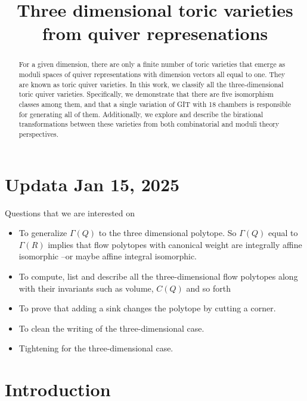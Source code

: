 \documentclass[11pt]{amsart}
\title{
Three dimensional toric varieties from quiver represenations
}
\date{}
\theoremstyle{plain}
\theoremstyle{definition}
\begin{document}
\begin{abstract}
For a given dimension, there are only a finite number of toric varieties that emerge as moduli spaces of quiver representations with dimension vectors all equal to one. They are known as toric quiver varieties. In this work, we classify all the three-dimensional toric quiver varieties. Specifically, we demonstrate that there are five isomorphism classes among them, and that a single variation of GIT with 18 chambers is responsible for generating all of them. Additionally, we explore and describe the birational transformations between these varieties from both combinatorial and moduli theory perspectives.
\end{abstract}
\maketitle

\section{Updata Jan 15, 2025}

Questions that we are interested on
\begin{itemize}
    \item To generalize $\Gamma(Q)$ to the three dimensional polytope. So $\Gamma(Q) $ equal to $\Gamma(R)$ implies that flow polytopes with canonical weight are integrally affine isomorphic --or maybe affine integral isomorphic. 
    \item To compute, list and describe all the three-dimensional flow polytopes along with their invariants such as volume, $C(Q)$ and so forth
    \item[1.] To prove that adding a sink changes the polytope by cutting a corner.  
    \item To clean the writing of the three-dimensional case.
    \item Tightening for the three-dimensional case. 
\end{itemize}


\section{Introduction}
\end{document}
